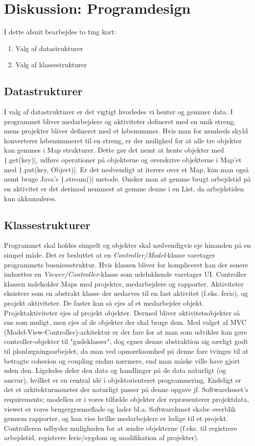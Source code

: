 \section{Diskussion: Programdesign}
I dette afsnit bearbejdes to ting kort:
\begin{enumerate}
    \item Valg af datastrukturer
    \item Valg af klassestrukturer
\end{enumerate}
\subsection{Datastrukturer} I valg af datastrukturer er det vigtigt hvorledes vi henter og gemmer data. I programmet bliver medarbejdere og aktiviteter defineret med en unik streng, mens projekter bliver defineret med et løbenummer. Hvis man for nemheds skyld konverterer løbenummeret til en streng, er der mulighed for at alle tre objekter kan gemmes i Map strukturer. Dette gør det nemt at hente objekter med \texttt|.get(key)|, udføre operationer på objekterne og overskrive objekterne i Map'et med \texttt|.put(key, Object)|. Er det nødvendigt at iterere over et Map, kan man også nemt bruge Java's \texttt|.stream()| metode. Ønsker man at gemme brugt arbejdstid på en aktivitet er det derimod nemmest at gemme denne i en List, da arbejdstiden kun akkumuleres.
\subsection{Klassestrukturer} Programmet skal holdes simpelt og objekter skal nødvendigvis eje hinanden på en simpel måde. Det er besluttet at en \emph{Controller/Model}-klasse varetager programmets busniessstruktur. Hvis klassen bliver for kompliceret kan der senere indsættes en \emph{Viewer/Controller}-klasse som udelukkende varetager UI. Controller klassen indeholder Maps med projekter, medarbejdere og rapporter. Aktiviteter eksistere som en abstrakt klasse der nedarves til en fast aktivitet (f.eks. ferie), og projekt aktiviteter. De faster kan så ejes af et medarbejder objekt. Projektaktiviteter ejes af projekt objekter. Dermed bliver aktivitetsobjekter så ens som muligt, men ejes af de objekter der skal bruge dem. Med valget af MVC (Model-View-Controller)-arkitektur er der fare for at man som udvikler kan gøre controller-objekter til "gudeklasser", dog egner denne abstraktion sig særligt godt til planlægningsarbejdet, da man ved opmærksomhed på denne fare tvinges til at betragte cohesion og coupling endnu nærmere, end man måske ville have gjort uden den. Ligeledes deler den data og handlinger på de data naturligt (og ansvar), hvilket er en central idé i objektorienteret programmering. Endeligt er det et arkitekturmønster der naturligt passer på denne opgave jf. Softwarehuset's requirements; modellen er i vores tilfælde objekter der repræsenterer projektdata, viewet er vores brugergrænseflade og lader bl.a. Softwarehuset skabe overblik gennem rapporter, og kan vise hvilke medarbejdere er ledige til et projekt. Controlleren udbyder muligheden for at ændre objekterne (f.eks. til registrere arbejdstid, registrere ferie/sygdom og modifikation af projekter).